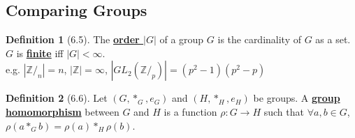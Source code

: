 \documentclass{article}
\newcommand{\Z}{\ensuremath{\mathbb{Z}}}
\newcommand{\Zn}[1]{\ensuremath{\mathbb{Z}/_#1}}
\newcommand{\define}[1]{\textbf{\underline{#1}}}
\newcommand{\func}[3]{\ensuremath{#1: #2 \to #3}}
\theoremstyle{definition}
\newtheorem*{defn}{Definition}
\theoremstyle{remark}
\begin{document}
    \subsection*{Comparing Groups}{
        \begin{defn}[6.5]
            The \define{order $|G|$} of a group $G$ is the cardinality of $G$ as a set. $G$ is \define{finite} iff $|G| <\infty$.\\
            e.g. $|\Zn{n}|=n$, $|\Z|=\infty$, $|GL_2(\Zn{p})|=(p^2-1)(p^2-p)$
        \end{defn}
        
        \begin{defn}[6.6]
            Let $(G, *_G, e_G)$ and $(H, *_H, e_H)$ be groups. A \define{group homomorphism} between $G$ and $H$ is a function $\func{\rho}{G}{H}$ such that $\forall a,b \in G$, $\rho(a*_Gb)=\rho(a)*_H\rho(b)$.
        \end{defn}
    
    }
    
\end{document}
